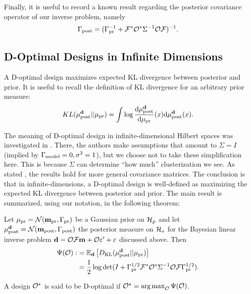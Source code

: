 \documentclass{amsart}
\numberwithin{equation}{section}
\begin{document}
Finally, it is useful to record a known result regarding the posterior
covariance operator of our inverse problem, namely
\begin{align}\label{eq:postcov}
  \Gamma_{\textup{post}} = (\Gamma_{\textup{pr}}^{-1} + \mathcal{F}^* \mathcal{O}^* \Sigma^{-1} \mathcal{O} \mathcal{F}
  )^{-1}.
\end{align}


\subsection{D-Optimal Designs in Infinite Dimensions}\label{subsec:D optimal design} 
A D-optimal design maximizes expected KL divergence between posterior
and prior. It is useful to recall the definition of KL divergence for
an arbitrary prior measure:
$$
KL(\mu_{\textup{post}}^{\mathbf{d}}||\mu_{\textup{pr}}) = \int \log \frac{\text{\textup{d}} \mu_{\textup{post}}^{\mathbf{d}}}{\text{\textup{d}} \mu_{\textup{pr}}}(x) \text{\textup{d}} \mu_{\textup{post}}^{\mathbf{d}}(x).
$$

The meaning of D-optimal design in infinite-dimensional Hilbert spaces
was investigated in \cite{AlexanderianGloorGhattas14}. There, the
authors make assumptions that amount to $\Sigma=I$ (implied by
$\Gamma_{\textup{model}} = 0,\sigma^2=1$), but we choose not to take these
simplification here. This is because $\Sigma$ can determine ``how
much'' clusterization we see. As stated
\cite[pp. 681]{AlexanderianGloorGhattas14}, the results hold for more
general covariance matrices. The conclusion is that in
infinite-dimensions, a D-optimal design is well-defined as maximizing
the expected KL divergence between posterior and prior. The main
result is summarized, using our notation, in the following theorem:
\begin{theorem}
  Let $\mu_{\textup{pr}} = \mathcal{N}(\mathbf{m}_{\textup{pr}},\Gamma_{\textup{pr}})$ be a Gaussian prior on $\mathcal{H}_p$
  and let $\mu_{\textup{post}}^{\mathbf{d}} = \mathcal{N}(\mathbf{m}_{\textup{post}},\Gamma_{\textup{post}})$ the posterior measure
  on $\mathcal{H}_o$ for the Bayesian linear inverse problem $\mathbf{d} = \mathcal{O}
  \mathcal{F}\mathbf{m} + \mathcal{O} \varepsilon' + \varepsilon$ discussed above. Then
  \begin{align}\label{eq:objective}
    \begin{split}
      \Psi( \mathcal{O}) :&= \mathbb{E}_{\mathbf{d}}\left [ D_{\text{KL}} (\mu_{\textup{post}}^{\mathbf{d}} || \mu_{\textup{pr}} ) \right ] \\
      &= \frac12 \log \det 
      ( I + \Gamma_{\textup{pr}}^{1/2}  \mathcal{F} ^* \mathcal{O}^* \Sigma^{-1} \mathcal{O} \mathcal{F} \Gamma_{\textup{pr}}^{1/2}).
    \end{split}
  \end{align}
\end{theorem}
\begin{definition}\label{def:d optimality}
  A design $\mathcal{O}^{\star}$ is said to be D-optimal if $\mathcal{O}^{\star} = \operatorname*{arg\,max}_{\mathcal{O}} \Psi(\mathcal{O})$.
\end{definition}
\end{document}
